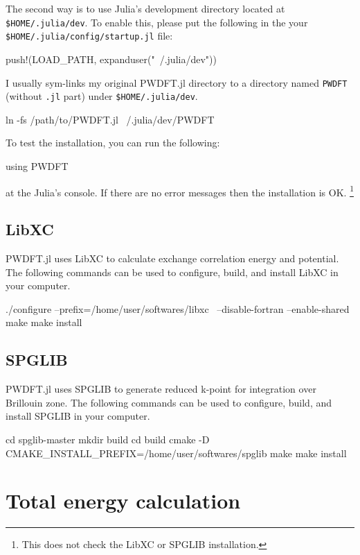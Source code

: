 \documentclass[a4paper,12pt]{article}
\begin{document}
The second way is to use Julia's development directory located at
\texttt{\$HOME/.julia/dev}.
To enable this, please put the following in the
your \texttt{\$HOME/.julia/config/startup.jl} file:
\begin{juliacode}
push!(LOAD_PATH, expanduser("~/.julia/dev"))
\end{juliacode}
I usually sym-links my original \textsf{PWDFT.jl} directory
to a directory named \texttt{PWDFT} (without \texttt{.jl} part)
under \texttt{\$HOME/.julia/dev}.
\begin{textcode}
ln -fs /path/to/PWDFT.jl ~/.julia/dev/PWDFT
\end{textcode}

To test the installation, you can run the following:
\begin{juliacode}
using PWDFT
\end{juliacode}
at the Julia's console.
If there are no error messages then the installation is OK.
\footnote{This does not check the LibXC or SPGLIB installation.}

\subsection{LibXC}

\textsf{PWDFT.jl} uses LibXC to calculate exchange correlation energy
and potential.
The following commands can be used to configure, build, and install LibXC
in your computer.
\begin{textcode}
./configure --prefix=/home/user/softwares/libxc \
  --disable-fortran --enable-shared
make
make install
\end{textcode}

\subsection{SPGLIB}

\textsf{PWDFT.jl} uses SPGLIB to generate reduced k-point for integration
over Brillouin zone.
The following commands can be used to configure, build, and install SPGLIB
in your computer.
\begin{textcode}
cd spglib-master
mkdir build
cd build
cmake -D CMAKE_INSTALL_PREFIX=/home/user/softwares/spglib
make
make install
\end{textcode}


\section{Total energy calculation}
\end{document}
